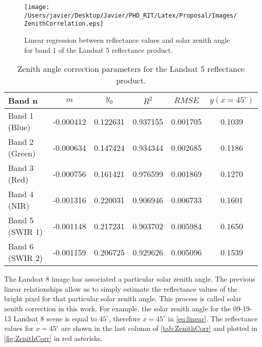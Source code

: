 \documentclass[]{spie}  %
\begin{document}
\begin{figure}[htb]
  	\centering
  	\texttt{[image: /Users/javier/Desktop/Javier/PHD\_RIT/Latex/Proposal/Images/ZenithCorrelation.eps]}
  \caption{Linear regression between reflectance values and solar zenith angle for band 1 of the Landsat 5 reflectance product. \label{fig:Band1Corr} } 
\end{figure}

\begin{table}[!ht]
\caption{ Zenith angle correction parameters for the Landsat 5 reflectance product. \label{tab:ZenithCorr} } 
\centering
\begin{tabular}{l|c|c|c|c|c} 
 \bfseries{Band n} & \bfseries{$m$}      & \bfseries{$y_0$}    & \bfseries{$R^2$}     & \bfseries{$RMSE$} & $y(x=45^\circ)$   \\ \hline \hline
 Band 1 (Blue) 		& -0.000412 & 0.122631 & 0.937155 & 0.001705 &      0.1039\\
 Band 2 (Green) 	& -0.000634 & 0.147424 & 0.934344 & 0.002685 &      0.1186\\
 Band 3 (Red) 		& -0.000756 & 0.161421 & 0.976599 & 0.001869 &      0.1270\\
 Band 4 (NIR) 		& -0.001316 & 0.220031 & 0.906946 & 0.006733 &      0.1601\\
 Band 5 (SWIR 1) 	& -0.001148 & 0.217231 & 0.903702 & 0.005984 &      0.1650\\
 Band 6 (SWIR 2) 	& -0.001159 & 0.206725 & 0.929626 & 0.005096 &      0.1539\\  
 \end{tabular}
\end{table}

The Landsat 8 image has associated a particular solar zenith angle. The previous linear relationships allow us to simply estimate the reflectance values of the bright pixel for that particular solar zenith angle. This process is called solar zenith correction in this work. For example, the solar zenith angle for the 09-19-13 Landsat 8 scene is equal to $45^\circ$, therefore $x=45^\circ$ in \autoref{eq:linear}. The reflectance values for $x=45^\circ$ are shown in the last column of \autoref{tab:ZenithCorr} and plotted in \autoref{fig:ZenithCorr} in red asterisks.
\end{document}
